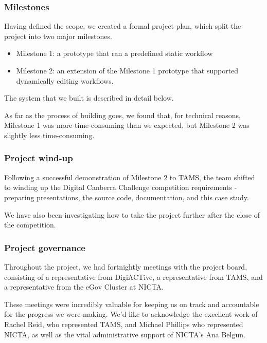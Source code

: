 \documentclass[12pt,a4paper,twosided]{article}
\begin{document}
\subsubsection{Milestones}

Having defined the scope, we created a formal project plan, which split
the project into two major milestones.

\begin{itemize}

\item
  Milestone 1: a prototype that ran a predefined static workflow
\item
  Milestone 2: an extension of the Milestone 1 prototype that supported
  dynamically editing workflows.
\end{itemize}

The system that we built is described in detail below. 

As far as the
process of building goes, we found that, for technical reasons,
Milestone 1 was more time-consuming than we expected, but Milestone 2
was slightly less time-consuming.

\subsubsection{Project wind-up}

Following a successful demonstration of Milestone 2 to TAMS, the team
shifted to winding up the Digital Canberra Challenge competition
requirements - preparing presentations, the source code, documentation,
and this case study.

We have also been investigating how to take the project further after
the close of the competition.

\subsubsection{Project governance}

Throughout the project, we had fortnightly meetings with the project
board, consisting of a representative from DigiACTive, a representative
from TAMS, and a representative from the eGov Cluster at NICTA.

These meetings were incredibly valuable for keeping us on track and
accountable for the progress we were making. We'd like to acknowledge
the excellent work of Rachel Reid, who represented TAMS, and Michael
Phillips who represented NICTA, as well as the vital administrative
support of NICTA's Ana Belgun.
\end{document}
